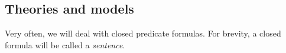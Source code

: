 

\setcounter{section}{3}
\setcounter{subsection}{1}
\setcounter{dfn}{0}

\subsection{Theories and models}
Very often, we will deal with closed predicate formulas.
For brevity, a closed formula will be called a \emph{sentence}.


